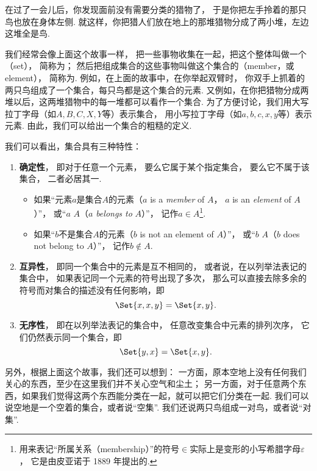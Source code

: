 在过了一会儿后，你发现面前没有需要分类的猎物了，
于是你把左手拎着的那只鸟也放在身体左侧.
就这样，你把猎人们放在地上的那堆猎物分成了两小堆，左边这堆全是鸟.


我们经常会像上面这个故事一样，
把一些事物收集在一起，把这个整体叫做一个（set），
简称为；
然后把组成集合的这些事物叫做这个集合的（member，或element），
简称为.
例如，在上面的故事中，在你举起双臂时，
你双手上抓着的两只鸟组成了一个集合，每只鸟都是这个集合的元素.
又例如，在你把猎物分成两堆以后，这两堆猎物中的每一堆都可以看作一个集合.
为了方便讨论，我们用大写拉丁字母（如\(A,B,C,X,Y\)等）表示集合，
用小写拉丁字母（如\(a,b,c,x,y\)等）表示元素.
由此，我们可以给出一个集合的粗糙的定义.

我们可以看出，集合具有三种特性：
\begin{enumerate}
	\item {\bf 确定性}，
	即对于任意一个元素，
	要么它属于某个指定集合，
	要么它不属于该集合，
	二者必居其一.
	\begin{itemize}
		\item 如果“元素\(a\)是集合\(A\)的元素（\(a\) is a \emph{member} of \(A\)，
		\(a\) is an \emph{element} of \(A\)）”，
		或“\(a\) \(A\)（\(a\) \emph{belongs to} \(A\)）”，
		记作\(a \in A\)\footnote{%
		用来表记“所属关系（membership）”的符号\(\in\)实际上是变形的小写希腊字母\(\varepsilon\)，%
		它是由皮亚诺于 1889 年提出的.}.

		\item 如果“\(b\)不是集合\(A\)的元素（\(b\) is not an element of \(A\)）”，%
		或“\(b\) \(A\)（\(b\) does not belong to \(A\)）”，%
		记作\(b \notin A\).
	\end{itemize}

	\item {\bf 互异性}，
	即同一个集合中的元素是互不相同的，
	或者说，在以列举法表记的集合中，
	如果表记同一个元素的符号出现了多次，
	那么可以直接去除多余的符号而对集合的描述没有任何影响，即\[
		\Set{ x, x, y } = \Set{ x, y }.
	\]

	\item {\bf 无序性}，
	即在以列举法表记的集合中，
	任意改变集合中元素的排列次序，
	它们仍然表示同一个集合，即\[
		\Set{ y, x } = \Set{ x, y }.
	\]
\end{enumerate}



另外，根据上面这个故事，我们还可以想到：
一方面，原本空地上没有任何我们关心的东西，至少在这里我们并不关心空气和尘土；
另一方面，对于任意两个东西，如果我们觉得这两个东西能分类在一起，就可以把它们分类在一起.
我们可以说空地是一个空着的集合，或者说“空集”.
我们还说两只鸟组成一对鸟，或者说“对集”.

